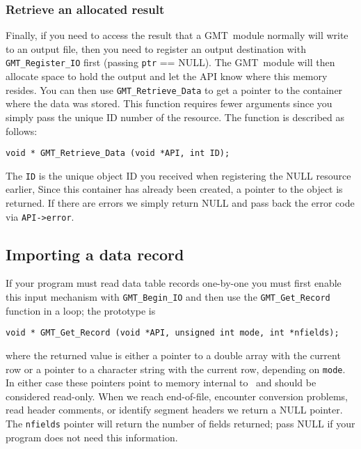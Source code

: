 \documentclass[11pt]{report}
\begin{document}
\subsubsection{Retrieve an allocated result}

Finally, if you need to access the result that a GMT\ module normally will write to an output file,
then you need to register an output destination with \texttt{GMT\_Register\_IO} first (passing \texttt{ptr} == NULL).
The GMT\ module will then allocate space to hold the output and let the API know where this memory resides.
You can then use \texttt{GMT\_Retrieve\_Data} to get a pointer to the container where the data was stored.
This function requires fewer arguments since you simply
pass the unique ID number of the resource.  The function is described as follows:


\begin{verbatim}
void * GMT_Retrieve_Data (void *API, int ID);
\end{verbatim}
The \texttt{ID} is the unique object ID you received when registering the NULL resource earlier,
Since this container has already been created, a pointer to the object is returned.
If there are errors we simply return NULL and pass back the error code via \texttt{API->error}.

\subsection{Importing a data record}

If your program must read data table records one-by-one you must first
enable this input mechanism with \texttt{GMT\_Begin\_IO} and then use the
\texttt{GMT\_Get\_Record} function in a loop; the prototype is

\begin{verbatim}
void * GMT_Get_Record (void *API, unsigned int mode, int *nfields);
\end{verbatim}
where the returned value is either a pointer to a double array with the current row
or a pointer to a character string with the current row, depending on \texttt{mode}.
In either case these pointers point to memory internal to \GMT\ and should be considered read-only.
When we reach end-of-file, encounter conversion problems, read header comments, or identify
segment headers we return a NULL pointer.
The \texttt{nfields} pointer will return the number of fields returned; pass NULL if your program
does not need this information.
\end{document}
